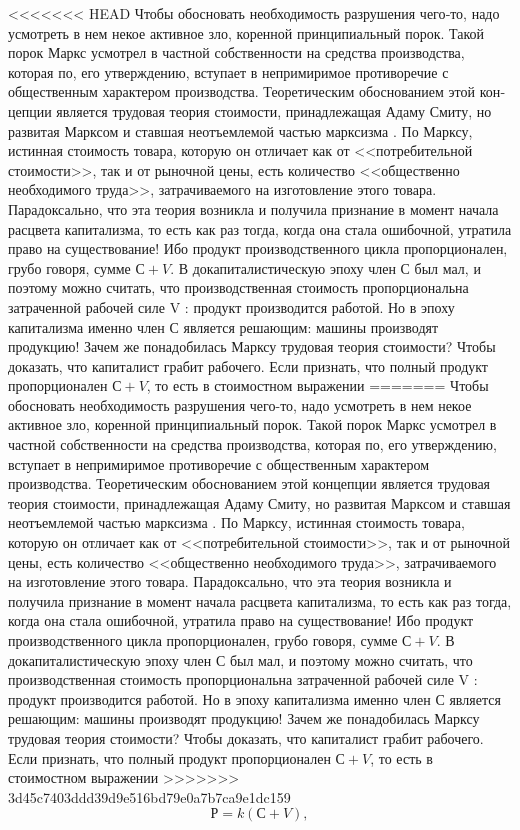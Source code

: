 \documentclass{book}
\begin{document}
<<<<<<< HEAD
Чтобы обосновать необходимость разрушения чего‑то, надо усмотреть в нем некое активное зло, коренной принципиаль­ный порок. Такой порок Маркс усмотрел в частной собствен­ности на средства производства, которая по, его утверждению, вступает в непримиримое противоречие с общественным харак­тером производства. Теоретическим обоснованием этой кон­цепции является трудовая теория стоимости, принадлежащая Адаму Смиту, но развитая Марксом и ставшая неотъемлемой частью марксизма . По Марксу, истинная стоимость товара, которую он отличает как от <<потребительной стоимости>>, так и от рыночной цены, есть количество <<общественно необходи­мого труда>>, затрачиваемого на изготовление этого товара. Парадоксально, что эта теория возникла и получила призна­ние в момент начала расцвета капитализма, то есть как раз тогда, когда она стала ошибочной, утратила право на сущест­вование! Ибо продукт производственного цикла пропорционален, грубо говоря, сумме $С + V$. В докапиталистическую эпоху член $С$ был мал, и поэтому можно считать, что произ­водственная стоимость пропорциональна затраченной рабочей силе V : продукт производится работой. Но в эпоху капитализ­ма именно член $С$ является решающим: машины производят продукцию! Зачем же понадобилась Марксу трудовая теория стоимости? Чтобы доказать, что капиталист грабит  рабочего. Если признать, что полный продукт пропорционален $С + V$, то есть в стоимостном выражении
=======
Чтобы обосновать необходимость разрушения чего-то, надо усмотреть в нем некое активное зло, коренной принципиаль­ный порок. Такой порок Маркс усмотрел в частной собствен­ности на средства производства, которая по, его утверждению, вступает в непримиримое противоречие с общественным харак­тером производства. Теоретическим обоснованием этой кон­цепции является трудовая теория стоимости, принадлежащая Адаму Смиту, но развитая Марксом и ставшая неотъемлемой частью марксизма . По Марксу, истинная стоимость товара, которую он отличает как от <<потребительной стоимости>>, так и от рыночной цены, есть количество <<общественно необходи­мого труда>>, затрачиваемого на изготовление этого товара. Парадоксально, что эта теория возникла и получила призна­ние в момент начала расцвета капитализма, то есть как раз тогда, когда она стала ошибочной, утратила право на сущест­вование! Ибо продукт производственного цикла пропорционален, грубо говоря, сумме $С + V$. В докапиталистическую эпоху член $С$ был мал, и поэтому можно считать,
 что произ­водственная стоимость пропорциональна затраченной рабочей силе V : продукт производится работой. Но в эпоху капитализ­ма именно член $С$ является решающим: машины производят продукцию! Зачем же понадобилась Марксу трудовая теория стоимости? Чтобы доказать, что капиталист грабит  рабочего. Если признать, что полный продукт пропорционален $С + V$, то есть в стоимостном выражении
>>>>>>> 3d45c7403ddd39d9e516bd79e0a7b7ca9e1dc159
\[
	Р = k(С + V),
\]
\end{document}
